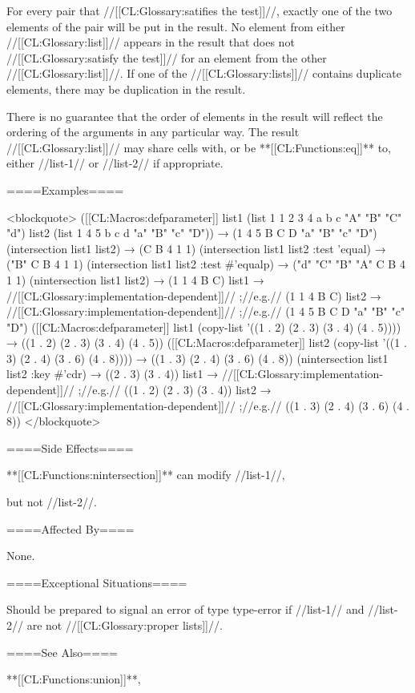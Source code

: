 For every pair that //[[CL:Glossary:satifies the test]]//, exactly one of the two elements of the pair will be put in the result. No element from either //[[CL:Glossary:list]]// appears in the result that does not //[[CL:Glossary:satisfy the test]]// for an element from the other //[[CL:Glossary:list]]//. If one of the //[[CL:Glossary:lists]]// contains duplicate elements, there may be duplication in the result.

There is no guarantee that the order of elements in the result will reflect the ordering of the arguments in any particular way. The result //[[CL:Glossary:list]]// may share cells with, or be **[[CL:Functions:eq]]** to, either //list-1// or //list-2// if appropriate.

====Examples====

<blockquote> ([[CL:Macros:defparameter]] list1 (list 1 1 2 3 4 a b c "A" "B" "C" "d") list2 (list 1 4 5 b c d "a" "B" "c" "D")) → (1 4 5 B C D "a" "B" "c" "D") (intersection list1 list2) → (C B 4 1 1) (intersection list1 list2 :test 'equal) → ("B" C B 4 1 1) (intersection list1 list2 :test #'equalp) → ("d" "C" "B" "A" C B 4 1 1) (nintersection list1 list2) → (1 1 4 B C) list1 → //[[CL:Glossary:implementation-dependent]]// ;//e.g.// (1 1 4 B C) list2 → //[[CL:Glossary:implementation-dependent]]// ;//e.g.// (1 4 5 B C D "a" "B" "c" "D") ([[CL:Macros:defparameter]] list1 (copy-list '((1 . 2) (2 . 3) (3 . 4) (4 . 5)))) → ((1 . 2) (2 . 3) (3 . 4) (4 . 5)) ([[CL:Macros:defparameter]] list2 (copy-list '((1 . 3) (2 . 4) (3 . 6) (4 . 8)))) → ((1 . 3) (2 . 4) (3 . 6) (4 . 8)) (nintersection list1 list2 :key #'cdr) → ((2 . 3) (3 . 4)) list1 → //[[CL:Glossary:implementation-dependent]]// ;//e.g.// ((1 . 2) (2 . 3) (3 . 4)) list2 → //[[CL:Glossary:implementation-dependent]]// ;//e.g.// ((1 . 3) (2 . 4) (3 . 6) (4 . 8)) </blockquote>

====Side Effects====

**[[CL:Functions:nintersection]]** can modify //list-1//,

but not //list-2//.

====Affected By====

None.

====Exceptional Situations====

Should be prepared to signal an error of type type-error if //list-1// and //list-2// are not //[[CL:Glossary:proper lists]]//.

====See Also====

**[[CL:Functions:union]]**,

